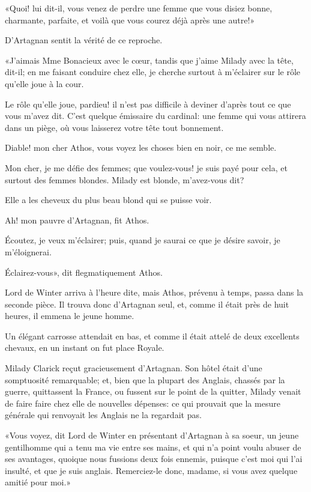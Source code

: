 «Quoi! lui dit-il, vous venez de perdre une femme que vous disiez bonne, charmante, parfaite, et voilà que vous courez déjà après une autre!» 

D'Artagnan sentit la vérité de ce reproche. 

«J'aimais Mme Bonacieux avec le cœur, tandis que j'aime Milady avec la tête, dit-il; en me faisant conduire chez elle, je cherche surtout à m'éclairer sur le rôle qu'elle joue à la cour. 

\speak  Le rôle qu'elle joue, pardieu! il n'est pas difficile à deviner d'après tout ce que vous m'avez dit. C'est quelque émissaire du cardinal: une femme qui vous attirera dans un piège, où vous laisserez votre tête tout bonnement. 

\speak  Diable! mon cher Athos, vous voyez les choses bien en noir, ce me semble. 

\speak  Mon cher, je me défie des femmes; que voulez-vous! je suis payé pour cela, et surtout des femmes blondes. Milady est blonde, m'avez-vous dit? 

\speak  Elle a les cheveux du plus beau blond qui se puisse voir. 

\speak  Ah! mon pauvre d'Artagnan, fit Athos. 

\speak  Écoutez, je veux m'éclairer; puis, quand je saurai ce que je désire savoir, je m'éloignerai. 

\speak  Éclairez-vous», dit flegmatiquement Athos. 

Lord de Winter arriva à l'heure dite, mais Athos, prévenu à temps, passa dans la seconde pièce. Il trouva donc d'Artagnan seul, et, comme il était près de huit heures, il emmena le jeune homme. 

Un élégant carrosse attendait en bas, et comme il était attelé de deux excellents chevaux, en un instant on fut place Royale. 

Milady Clarick reçut gracieusement d'Artagnan. Son hôtel était d'une somptuosité remarquable; et, bien que la plupart des Anglais, chassés par la guerre, quittassent la France, ou fussent sur le point de la quitter, Milady venait de faire faire chez elle de nouvelles dépenses: ce qui prouvait que la mesure générale qui renvoyait les Anglais ne la regardait pas. 

«Vous voyez, dit Lord de Winter en présentant d'Artagnan à sa soeur, un jeune gentilhomme qui a tenu ma vie entre ses mains, et qui n'a point voulu abuser de ses avantages, quoique nous fussions deux fois ennemis, puisque c'est moi qui l'ai insulté, et que je suis anglais. Remerciez-le donc, madame, si vous avez quelque amitié pour moi.» 

